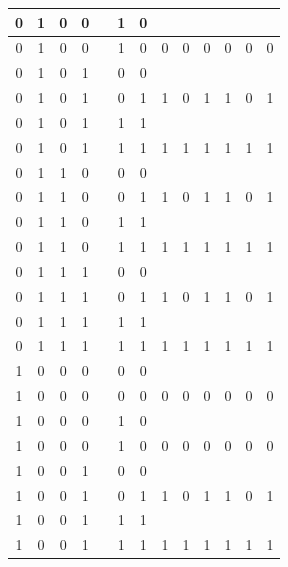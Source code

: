 \begin{table}[!tb]
\begin{tabular}{|c|c|c|c|c|c|c|c|c|c|c|c|c|}
        \rowcolor{yellow!40} 0 & 1 & 0 & 0 &  & 1 & 0 &  &  &  &  &  &  \\ \hline
        \rowcolor{yellow!40} 0 & 1 & 0 & 0 &  & 1 & 0 & 0 & 0 & 0 & 0 & 0 & 0 \\ \hline
        \rowcolor{gray!40} 0 & 1 & 0 & 1 &  & 0 & 0 &  &  &  &  &  &  \\ \hline
        \rowcolor{gray!40} 0 & 1 & 0 & 1 &  & 0 & 1 & 1 & 0 & 1 & 1 & 0 & 1 \\ \hline
        \rowcolor{blue!40} 0 & 1 & 0 & 1 &  & 1 & 1 &  &  &  &  &  &  \\ \hline
        \rowcolor{blue!40} 0 & 1 & 0 & 1 &  & 1 & 1 & 1 & 1 & 1 & 1 & 1 & 1 \\ \hline
        \rowcolor{red!40} 0 & 1 & 1 & 0 &  & 0 & 0 &  &  &  &  &  &  \\ \hline
        \rowcolor{red!40} 0 & 1 & 1 & 0 &  & 0 & 1 & 1 & 0 & 1 & 1 & 0 & 1 \\ \hline
        \rowcolor{green!40} 0 & 1 & 1 & 0 &  & 1 & 1 &  &  &  &  &  &  \\ \hline
        \rowcolor{green!40} 0 & 1 & 1 & 0 &  & 1 & 1 & 1 & 1 & 1 & 1 & 1 & 1 \\ \hline
        \rowcolor{yellow!40} 0 & 1 & 1 & 1 &  & 0 & 0 &  &  &  &  &  &  \\ \hline
        \rowcolor{yellow!40} 0 & 1 & 1 & 1 &  & 0 & 1 & 1 & 0 & 1 & 1 & 0 & 1 \\ \hline
        \rowcolor{gray!40} 0 & 1 & 1 & 1 &  & 1 & 1 &  &  &  &  &  &  \\ \hline
        \rowcolor{gray!40} 0 & 1 & 1 & 1 &  & 1 & 1 & 1 & 1 & 1 & 1 & 1 & 1 \\ \hline
        \rowcolor{blue!40} 1 & 0 & 0 & 0 &  & 0 & 0 &  &  &  &  &  &  \\ \hline
        \rowcolor{blue!40} 1 & 0 & 0 & 0 &  & 0 & 0 & 0 & 0 & 0 & 0 & 0 & 0 \\ \hline
        \rowcolor{red!40} 1 & 0 & 0 & 0 &  & 1 & 0 &  &  &  &  &  &  \\ \hline
        \rowcolor{red!40} 1 & 0 & 0 & 0 &  & 1 & 0 & 0 & 0 & 0 & 0 & 0 & 0 \\ \hline
        \rowcolor{green!40} 1 & 0 & 0 & 1 &  & 0 & 0 &  &  &  &  &  &  \\ \hline
        \rowcolor{green!40} 1 & 0 & 0 & 1 &  & 0 & 1 & 1 & 0 & 1 & 1 & 0 & 1 \\ \hline
        \rowcolor{yellow!40} 1 & 0 & 0 & 1 &  & 1 & 1 &  &  &  &  &  &  \\ \hline
        \rowcolor{yellow!40} 1 & 0 & 0 & 1 &  & 1 & 1 & 1 & 1 & 1 & 1 & 1 & 1 \\ \hline

\end{tabular}
\end{table}
